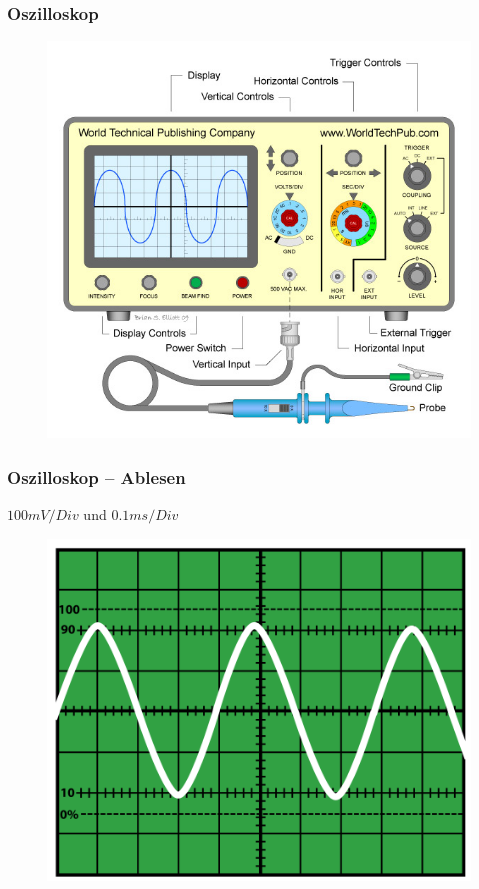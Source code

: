 \begin{frame}
  \frametitle{Oszilloskop}
  \begin{center}
    \begin{figure}
      \includegraphics[width=.8\textwidth,height=.75\textheight,keepaspectratio]{e17/WTPCOscilloscopeBeschreiben.jpg}
    \end{figure}
  \end{center}
\end{frame}

\begin{frame}
  \frametitle{Oszilloskop -- Ablesen}
  \begin{center}
    $100mV / Div$ und $0.1ms / Div$\\
    \begin{figure}
      \includegraphics[width=.8\textwidth,height=.65\textheight,keepaspectratio]{e17/OsziTon.png}
    \end{figure}
  \end{center}
\end{frame}

